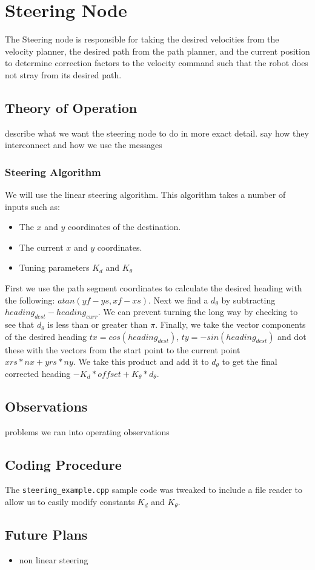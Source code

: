 \section{Steering Node}

The Steering node is responsible for taking the desired velocities from
the velocity planner, the desired path from the path planner, and the
current position to determine correction factors to the velocity command
such that the robot does not stray from its desired path.

\subsection{Theory of Operation}

describe what we want the steering node to do in more exact detail. say
how they interconnect and how we use the messages

\subsubsection{Steering Algorithm}

We will use the linear steering algorithm. This algorithm takes a number
of inputs such as:

\begin{itemize}
\item
  The $x$ and $y$ coordinates of the destination.
\item
  The current $x$ and $y$ coordinates.
\item
  Tuning parameters $K_d$ and $K_\theta$
\end{itemize}
First we use the path segment coordinates to calculate the desired
heading with the following: $atan(yf-ys,xf-xs)$. Next we find a
$d_\theta$ by subtracting $heading_{dest}-heading_{curr}$. We can
prevent turning the long way by checking to see that $d_\theta$ is less
than or greater than $\pi$. Finally, we take the vector components of
the desired heading $tx=cos(heading_{dest})$, $ty=-sin(heading_{dest})$
and dot these with the vectors from the start point to the current point
$xrs*nx+yrs*ny$. We take this product and add it to $d_\theta$ to get
the final corrected heading $-K_d*offset+K_{\theta}*d_\theta$.

\subsection{Observations}

problems we ran into operating observations

\subsection{Coding Procedure}

The \texttt{steering\_example.cpp} sample code was tweaked to include a
file reader to allow us to easily modify constants $K_d$ and $K_\theta$.

\subsection{Future Plans}

\begin{itemize}
\item
  non linear steering
\end{itemize}
